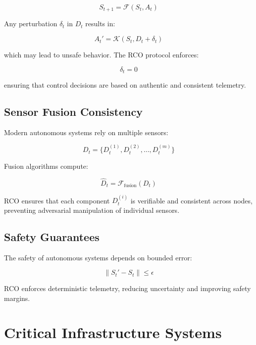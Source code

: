 \begin{equation}
S_{t+1} = \mathcal{F}(S_t, A_t)
\end{equation}

Any perturbation $\delta_t$ in $D_t$ results in:

\begin{equation}
A_t' = \mathcal{K}(S_t, D_t + \delta_t)
\end{equation}

which may lead to unsafe behavior. The RCO protocol enforces:

\begin{equation}
\delta_t = 0
\end{equation}

ensuring that control decisions are based on authentic and consistent telemetry.

\subsection{Sensor Fusion Consistency}

Modern autonomous systems rely on multiple sensors:

\begin{equation}
D_t = \{D_t^{(1)}, D_t^{(2)}, \dots, D_t^{(m)}\}
\end{equation}

Fusion algorithms compute:

\begin{equation}
\hat{D}_t = \mathcal{F}_{\text{fusion}}(D_t)
\end{equation}

RCO ensures that each component $D_t^{(i)}$ is verifiable and consistent across nodes, preventing adversarial manipulation of individual sensors.

\subsection{Safety Guarantees}

The safety of autonomous systems depends on bounded error:

\begin{equation}
\|S_t' - S_t\| \leq \epsilon
\end{equation}

RCO enforces deterministic telemetry, reducing uncertainty and improving safety margins.

\section{Critical Infrastructure Systems}

